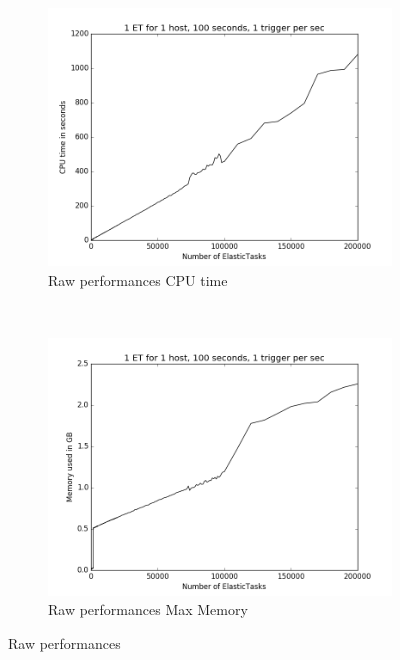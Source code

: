 \documentclass[a4paper, onecolumn]{article}
\begin{document}
    \begin{figure}
      \centering
      \hspace*{-4em}
	  \begin{subfigure}[t]{0.6\textwidth}
        \includegraphics[width=\textwidth]{../plots/raw_perf_time}
        \caption{Raw performances CPU time}
        \label{time_raw}
	  \end{subfigure}%
	  ~
	  \begin{subfigure}[t]{0.6\textwidth}
        \includegraphics[width=\textwidth]{../plots/raw_perf_mem}
        \caption{Raw performances Max Memory}
        \label{mem_raw}
      \end{subfigure}%
      \caption{Raw performances}
    \end{figure}
    
\end{document}
